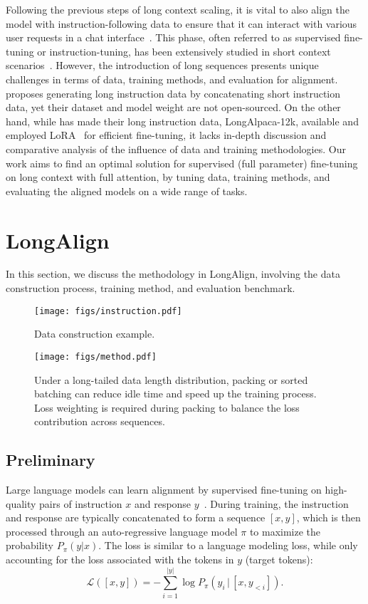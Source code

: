 Following the previous steps of long context scaling, it is vital to also align the model with instruction-following data to ensure that it can interact with various user requests in a chat interface~\cite{wang2023how}.
This phase, often referred to as supervised fine-tuning or instruction-tuning, has been extensively studied in short context scenarios~\cite{selfinstruct,alpaca,wang2023how,tunstall2023zephyr}.
However, the introduction of long sequences presents unique challenges in terms of data, training methods, and evaluation for alignment.
\citet{xiong2023effective} proposes generating long instruction data by concatenating short instruction data, yet their dataset and model weight are not open-sourced.
On the other hand, while \citet{chen2023longlora} has made their long instruction data, LongAlpaca-12k, available and employed LoRA~\cite{hu2022lora} for efficient fine-tuning, it lacks in-depth discussion and comparative analysis of the influence of data and training methodologies.
Our work aims to find an optimal solution for supervised (full parameter) fine-tuning on long context with full attention, by tuning data, training methods, and evaluating the aligned models on a wide range of tasks.
\section{LongAlign}
\label{sec:method}
In this section, we discuss the methodology in LongAlign, involving the data construction process, training method, and evaluation benchmark.

\begin{figure}[t]
    \centering
    \texttt{[image: figs/instruction.pdf]}
    \caption{Data construction example.}
    \label{fig:inst}
\end{figure}

\begin{figure*}
    \centering
    \texttt{[image: figs/method.pdf]}
    \caption{Under a long-tailed data length distribution, packing or sorted batching can reduce idle time and speed up the training process. Loss weighting is required during packing to balance the loss contribution across sequences.}
    \label{fig:method}
\end{figure*}

\subsection{Preliminary}
Large language models can learn alignment by supervised fine-tuning on high-quality pairs of instruction $x$ and response $y$~\cite{ouyang2022training,chung2022scaling}. During training, the instruction and response are typically concatenated to form a sequence $[x,y]$, which is then processed through an auto-regressive language model $\pi$ to maximize the probability $P_\pi(y|x)$.
The loss is similar to a language modeling loss, while only accounting for the loss associated with the tokens in $y$ (target tokens):
\begin{equation}
    \mathcal{L}([x, y]) = -\sum_{i=1}^{|y|}\log P_\pi(y_i\,|\,[x, y_{<i}]).
\end{equation}

